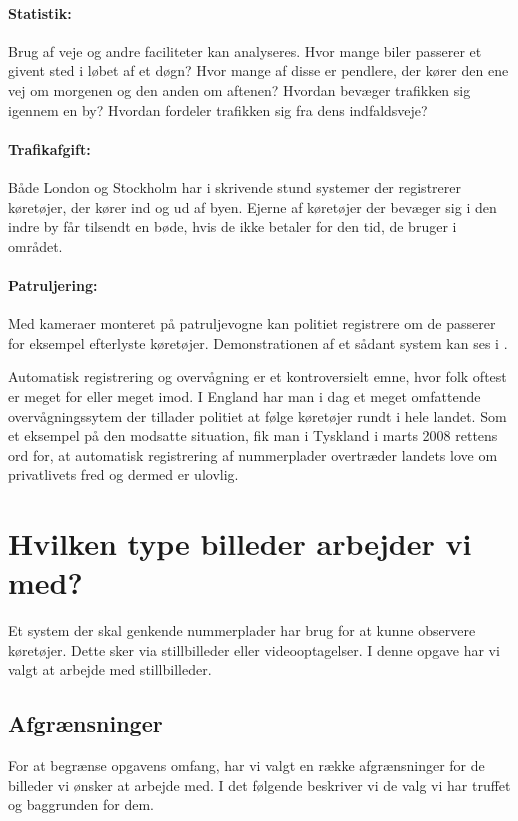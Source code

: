 \paragraph{Statistik:}
Brug af veje og andre faciliteter kan analyseres. Hvor mange biler passerer et givent sted i løbet af et døgn? Hvor mange af disse er pendlere, der kører den ene vej om morgenen og den anden om aftenen? Hvordan bevæger trafikken sig igennem en by? Hvordan fordeler trafikken sig fra dens indfaldsveje?

\paragraph{Trafikafgift:}
Både London og Stockholm har i skrivende stund systemer der registrerer køretøjer, der kører ind og ud af byen. Ejerne af køretøjer der bevæger sig i den indre by får tilsendt en bøde, hvis de ikke betaler for den tid, de bruger i området.

\paragraph{Patruljering:}
Med kameraer monteret på patruljevogne kan politiet registrere om de passerer for eksempel efterlyste køretøjer. Demonstrationen af et sådant system kan ses i \cite{canada_demo}. 

Automatisk registrering og overvågning er et kontroversielt emne, hvor folk oftest er meget for eller meget imod. I England har man i dag et meget omfattende overvågningssytem der tillader politiet at følge køretøjer rundt i hele landet\cite{wiki_baggrund}. Som et eksempel på den modsatte situation, fik man i Tyskland i marts 2008 rettens ord for, at automatisk registrering af nummerplader overtræder landets love om privatlivets fred og dermed er ulovlig\cite{tysk_ulovlig}.



\section{Hvilken type billeder arbejder vi med?}
\label{sec:data}
Et system der skal genkende nummerplader har brug for at kunne observere køretøjer. Dette sker via stillbilleder eller videooptagelser. I denne opgave har vi valgt at arbejde med stillbilleder.

\subsection{Afgrænsninger}
For at begrænse opgavens omfang, har vi valgt en række afgrænsninger for de billeder vi ønsker at arbejde med. I det følgende beskriver vi de valg vi har truffet og baggrunden for dem.

